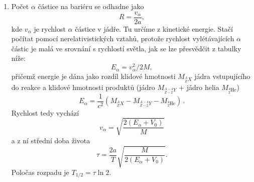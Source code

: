 \begin{solution}
\begin{enumerate}
	\item
		Počet  $\alpha$ částice na bariéru se odhadne jako
		\begin{equation}
			R=\frac{v_{\alpha}}{2a},
		\end{equation}
		kde $v_{\alpha}$ je rychlost $\alpha$ částice v jádře.
		Tu určíme z kinetické energie.
		Stačí počítat pomocí nerelativistických vztahů, protože rychlost vylétávajících $\alpha$ částic je malá ve srovnání s rychlostí světla, jak se lze přesvědčit z tabulky níže:
		\begin{equation}
			E_{\alpha}=v_{\alpha}^{2}/2M,
		\end{equation}
		přičemž energie je dána jako rozdíl klidové hmotnosti $M_{{}^{A}_{Z}X}$ jádra vstupujícího do reakce a klidové hmotnosti produktů (jádro $M_{{}^{A-4}_{Z-2}Y}$ + jádro helia $M_{{}^{4}_{2}\mathrm{He}}$)
		\begin{equation}
			E_{\alpha}=\frac{1}{c^{2}}\left(M_{{}^{A}_{Z}X}-M_{{}^{A-4}_{Z-2}Y}-M_{{}^{4}_{2}\mathrm{He}}\right)\,.
		\end{equation}
		Rychlost tedy vychází
		\begin{equation}
			v_{\alpha}=\sqrt{\frac{2\left(E_{\alpha}+V_{0}\right)}{M}}
		\end{equation}
		a z ní střední doba života
		\begin{equation}
			\tau=\frac{2a}{T}\sqrt{\frac{M}{2\left(E_{\alpha}+V_{0}\right)}}.
		\end{equation}
		Poločas rozpadu je $T_{1/2}=\tau\ln2$.


\end{enumerate}
\end{solution}
